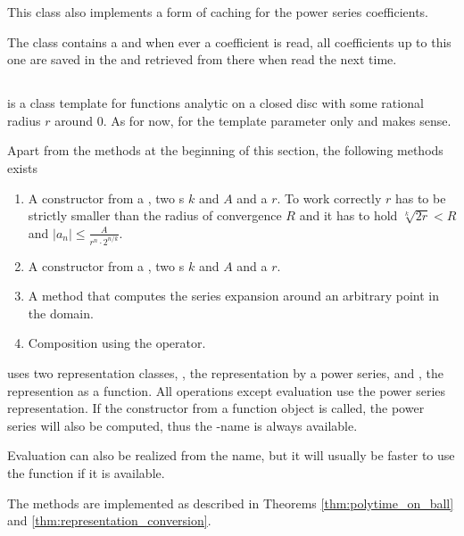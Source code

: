       This class also implements a form of caching for the power series coefficients.
      
      The  class contains a  and when ever
      a coefficient is read, all coefficients up to this one are saved in the  and retrieved from there when read the next time.

	\subsection{\baana}
		\textbf{} is a class template for functions analytic on a closed disc with some rational radius $r$ around $0$. 
		As for now, for the template parameter  only \real and \complex makes sense. 
		
		Apart from the methods at the beginning of this section, the following methods exists
		\begin{enumerate}
			\item A constructor from a \powerseries, two s $k$ and $A$ and a  $r$.
			To work correctly $r$ has to be strictly smaller than the radius of convergence $R$ 
			and it has to hold $\sqrt[k]{2r} < R$ and $|a_n| \leq \frac{A}{r^n \cdot 2^{n/k}}$.
			\item A constructor from a \func, two s $k$ and $A$ and a  $r$.
			\item A method  that computes the series expansion around
			an arbitrary point in the domain.
			\item Composition using the \code{()} operator.
		\end{enumerate}
		
		\baana uses two representation classes, , the representation by a power series, and , the represention as a function. 
		All operations except evaluation use the power series representation. 
		If the constructor from a function object is called, the power series will also be computed, 
		thus the -name is always available.

		Evaluation can also be realized from the  name, but it will usually be faster 
		to use the function if it is available.

    The methods are implemented as described in Theorems \ref{thm:polytime_on_ball} and \ref{thm:representation_conversion}. 

